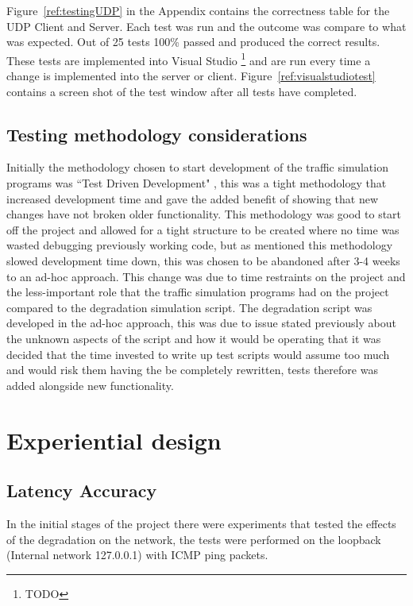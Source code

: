 Figure~\ref{ref:testingUDP} in the Appendix contains the correctness table for the UDP Client and Server. Each test was run and the outcome was compare to what was expected. Out of 25 tests 100\% passed and produced the correct results. These tests are implemented into Visual Studio \footnote{TODO} and are run every time a change is implemented into the server or client. Figure~\ref{ref:visualstudiotest} contains a screen shot of the test window after all tests have completed.

\subsection{Testing methodology considerations}
Initially the methodology chosen to start development of the traffic simulation programs was ``Test Driven Development" \citep{beck2003test}, this was a tight methodology that increased development time and gave the added benefit of showing that new changes have not broken older functionality. This methodology was good to start off the project and allowed for a tight structure to be created where no time was wasted debugging previously working code, but as mentioned this methodology slowed development time down, this was chosen to be abandoned after 3-4 weeks to an ad-hoc approach. 
This change was due to time restraints on the project and the less-important role that the traffic simulation programs had on the project compared to the degradation simulation script. The degradation script was developed in the ad-hoc approach, this was due to issue stated previously about the unknown aspects of the script and how it would be operating that it was decided that the time invested to write up test scripts would assume too much and would risk them having the be completely rewritten, tests therefore was added alongside new functionality.





%
\section{Experiential design}
\subsection{Latency Accuracy}
In the initial stages of the project there were experiments that tested the effects of the degradation on the network, the tests were performed on the loopback (Internal network 127.0.0.1) with ICMP ping packets.

